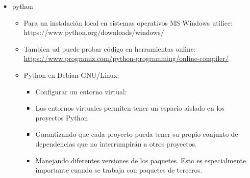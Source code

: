 \documentclass{article}
\begin{document}
\begin{itemize}
\begin{itemize}
\begin{itemize}
\begin{itemize}
                \item Para descarga en sistemas MacOS \url{https://git-scm.com/download/mac}
                \begin{lstlisting}
                    brew install git
                \end{lstlisting}
            \end{itemize}
        \end{itemize}
        \item python
        \begin{itemize}
            \item Para un instalación local en sistemas operativos MS Windows utilice: https://www.python.org/downloads/windows/
            \item Tambien ud puede probar código en herramientas online: \url{https://www.programiz.com/python-programming/online-compiler/}
            \item Python en Debian GNU/Linux:
            \begin{itemize}
            \begin{lstlisting}[language=bash,caption={Debian Linux viene con Python 3 y Python 2 preinstalados.}][H]
		          python3 --version
                    Python 3.9.2
	        \end{lstlisting}
            \begin{lstlisting}[language=bash,caption={Instalemos pip, una herramienta que instalará y administrará los paquetes de programación que queramos usar en nuestros proyectos de desarrollo.}][H]
		          sudo apt-get install -y python3-pip
	        \end{lstlisting}
            \begin{lstlisting}[language=bash,caption={Paquetes y herramientas de desarrollo más para instalar para garantizar que tengamos una configuración sólida para nuestro entorno de programación:}][H]
		          sudo apt-get install build-essential libssl-dev libffi-dev python3-dev
	        \end{lstlisting}
            \item Configurar un entorno virtual:
                \item Los entornos virtuales permiten tener un espacio aislado en los proyectos Python
                \item Garantizando que cada proyecto pueda tener su propio conjunto de dependencias que no interrumpirán a otros proyectos.
                \item Manejando diferentes versiones de los paquetes. Esto es especialmente importante cuando se trabaja con paquetes de terceros.

\end{itemize}
\end{itemize}
\end{itemize}
\end{itemize}
\end{document}

